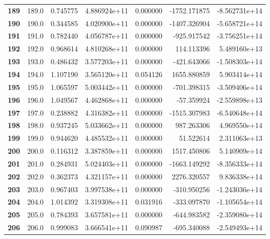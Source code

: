 \documentclass{report}[12pt]
\begin{document}
\begin{center}
\begin{tabular}{lrrrrrr}
\textbf{189 } &          189.0 &   0.745775 &  4.886924e+11 &    0.000000 & -1752.171875 & -8.562731e+14 \\
\textbf{190 } &          190.0 &   0.344585 &  4.020900e+11 &    0.000000 & -1407.326904 & -5.658721e+14 \\
\textbf{191 } &          191.0 &   0.782440 &  4.056787e+11 &    0.000000 &  -925.917542 & -3.756251e+14 \\
\textbf{192 } &          192.0 &   0.968614 &  4.810268e+11 &    0.000000 &   114.113396 &  5.489160e+13 \\
\textbf{193 } &          193.0 &   0.486432 &  3.577203e+11 &    0.000000 &  -421.643066 & -1.508303e+14 \\
\textbf{194 } &          194.0 &   1.107190 &  3.565120e+11 &    0.054126 &  1655.880859 &  5.903414e+14 \\
\textbf{195 } &          195.0 &   1.065597 &  5.003442e+11 &    0.000000 &  -701.398315 & -3.509406e+14 \\
\textbf{196 } &          196.0 &   1.049567 &  4.462868e+11 &    0.000000 &   -57.359924 & -2.559898e+13 \\
\textbf{197 } &          197.0 &   0.238882 &  4.316382e+11 &    0.000000 & -1515.307983 & -6.540648e+14 \\
\textbf{198 } &          198.0 &   0.937245 &  5.033662e+11 &    0.000000 &   987.263306 &  4.969550e+14 \\
\textbf{199 } &          199.0 &   0.944620 &  4.485532e+11 &    0.000000 &    51.522614 &  2.311063e+13 \\
\textbf{200 } &          200.0 &   0.116312 &  3.387859e+11 &    0.000000 &  1517.450806 &  5.140909e+14 \\
\textbf{201 } &          201.0 &   0.284931 &  5.024403e+11 &    0.000000 & -1663.149292 & -8.356333e+14 \\
\textbf{202 } &          202.0 &   0.362373 &  4.321157e+11 &    0.000000 &  2276.320557 &  9.836338e+14 \\
\textbf{203 } &          203.0 &   0.967403 &  3.997538e+11 &    0.000000 &  -310.950256 & -1.243036e+14 \\
\textbf{204 } &          204.0 &   1.014392 &  3.319308e+11 &    0.031916 &  -333.097870 & -1.105654e+14 \\
\textbf{205 } &          205.0 &   0.784393 &  3.657581e+11 &    0.000000 &  -644.983582 & -2.359080e+14 \\
\textbf{206 } &          206.0 &   0.999083 &  3.666541e+11 &    0.090987 &  -695.340088 & -2.549493e+14 \\

\end{tabular}
\end{center}
\end{document}
